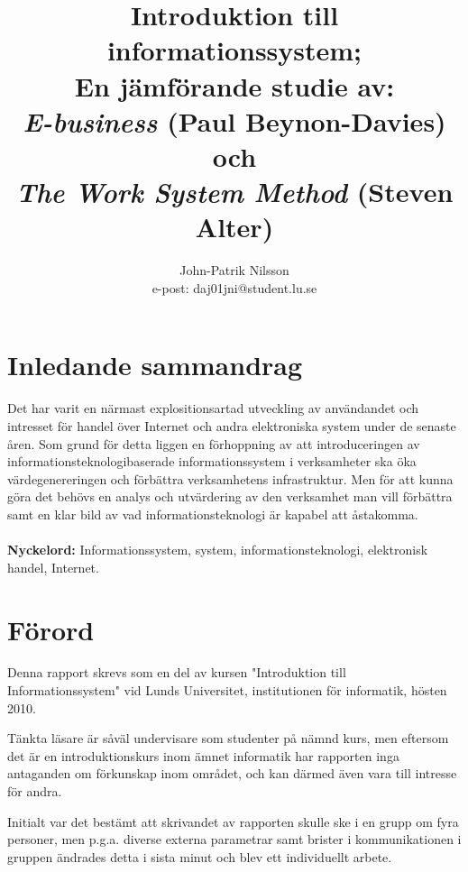 \documentclass[12pt,a4paper,titlepage]{article}
\title{\textsf{\textbf{Introduktion till informationssystem; \\ 
    En jämförande studie av: \\
    \textit{E-business} (Paul Beynon-Davies) och \\
    \textit{The Work System Method} (Steven Alter)}}}
\author{John-Patrik Nilsson \\
	e-post: daj01jni@student.lu.se}
\begin{document}

\pagestyle{headings}
\thispagestyle{empty}



\maketitle

\section*{\textsf{Inledande sammandrag}}
Det har varit en närmast explositionsartad utveckling av användandet och intresset för handel över Internet och andra elektroniska system under de senaste åren. Som grund för detta liggen en förhoppning av att introduceringen av informationsteknologibaserade informationssystem i verksamheter ska öka värdegenereringen och förbättra verksamhetens infrastruktur. Men för att kunna göra det behövs en analys och utvärdering av den verksamhet man vill förbättra samt en klar bild av vad informationsteknologi är kapabel att åstakomma.
\\
\\
\textbf{Nyckelord:} Informationssystem, system, informationsteknologi, elektronisk handel, Internet.

\tableofcontents

\section{\textsf{Förord}}
Denna rapport skrevs som en del av kursen "Introduktion till Informationssystem" vid Lunds Universitet, institutionen för informatik, hösten 2010. 

Tänkta läsare är såväl undervisare som studenter på nämnd kurs, men eftersom det är en introduktionskurs inom ämnet informatik har rapporten inga antaganden om förkunskap inom området, och kan därmed även vara till intresse för andra.

Initialt var det bestämt att skrivandet av rapporten skulle ske i en grupp om fyra personer, men p.g.a. diverse externa parametrar samt brister i kommunikationen i gruppen ändrades detta i sista minut och blev ett individuellt arbete.
\end{document}

